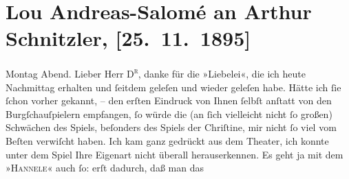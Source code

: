 

         
         \newcommand{\erwaehntePersonen}{Personen: Richard Beer-Hofmann, Hugo von Hofmannsthal}
         \newcommand{\erwaehnteOrte}{Orte: Burgtheater, Wien}
         \newcommand{\erwaehnteWerke}{Werke: Hanneles Himmelfahrt. Traumdichtung in zwei Teilen, Liebelei. Schauspiel in drei Akten}
               \section[Lou Andreas-Salomé an Arthur Schnitzler, {[}25. 11. 1895{]}]{ Lou Andreas-Salomé an Arthur Schnitzler, {[}25. 11. 1895{]}}\nopagebreak{}\rehead{ }\begin{ledgroupsized}[t]{13cm}\normalsize\beginnumbering \toendnotes[C]{\smallbreak\pagebreak[2]} 
\toendnotes[C]{\smallbreak}\pstart
           {\pb}Montag Abend.\pend
           \pstart{}Lieber Herr \textsc{D\textsuperscript{r}},\pend\pstart
           danke für die »Liebelei«, die ich heute Nachmittag
               erhalten und ſeitdem geleſen und wieder geleſen habe. Hätte ich ſie ſchon vorher
               gekannt, – den erſten Eindruck von Ihnen ſelbſt anſtatt von den Burgſchauſpielern empfangen, ſo würde die (an ſich vielleicht
               nicht ſo großen) Schwächen des Spiels, beſonders des Spiels der Chriſtine, mir nicht ſo viel vom Beſten
               verwiſcht haben. Ich kam ganz gedrückt aus dem Theater, ich konnte unter dem Spiel
               Ihre Eigenart nicht überall herauserkennen. Es geht ja mit dem »\textsc{Hannele}« {\pb}auch ſo: erſt dadurch, daß man das

\end{ledgroupsized}
